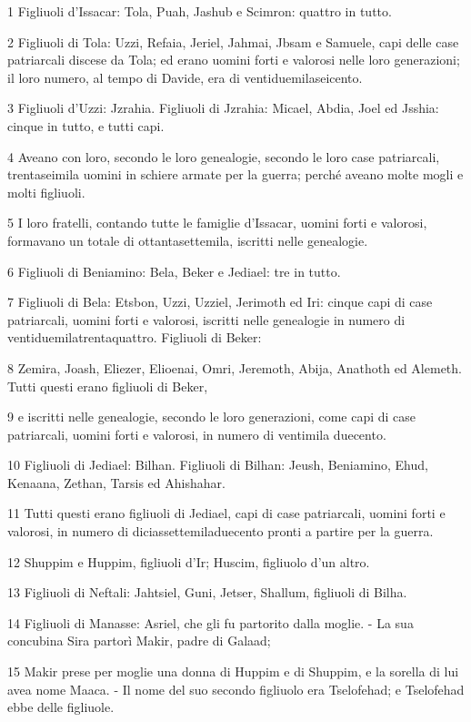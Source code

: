 \par 1 Figliuoli d'Issacar: Tola, Puah, Jashub e Scimron: quattro in tutto.
\par 2 Figliuoli di Tola: Uzzi, Refaia, Jeriel, Jahmai, Jbsam e Samuele, capi delle case patriarcali discese da Tola; ed erano uomini forti e valorosi nelle loro generazioni; il loro numero, al tempo di Davide, era di ventiduemilaseicento.
\par 3 Figliuoli d'Uzzi: Jzrahia. Figliuoli di Jzrahia: Micael, Abdia, Joel ed Jsshia: cinque in tutto, e tutti capi.
\par 4 Aveano con loro, secondo le loro genealogie, secondo le loro case patriarcali, trentaseimila uomini in schiere armate per la guerra; perché aveano molte mogli e molti figliuoli.
\par 5 I loro fratelli, contando tutte le famiglie d'Issacar, uomini forti e valorosi, formavano un totale di ottantasettemila, iscritti nelle genealogie.
\par 6 Figliuoli di Beniamino: Bela, Beker e Jediael: tre in tutto.
\par 7 Figliuoli di Bela: Etsbon, Uzzi, Uzziel, Jerimoth ed Iri: cinque capi di case patriarcali, uomini forti e valorosi, iscritti nelle genealogie in numero di ventiduemilatrentaquattro. Figliuoli di Beker:
\par 8 Zemira, Joash, Eliezer, Elioenai, Omri, Jeremoth, Abija, Anathoth ed Alemeth. Tutti questi erano figliuoli di Beker,
\par 9 e iscritti nelle genealogie, secondo le loro generazioni, come capi di case patriarcali, uomini forti e valorosi, in numero di ventimila duecento.
\par 10 Figliuoli di Jediael: Bilhan. Figliuoli di Bilhan: Jeush, Beniamino, Ehud, Kenaana, Zethan, Tarsis ed Ahishahar.
\par 11 Tutti questi erano figliuoli di Jediael, capi di case patriarcali, uomini forti e valorosi, in numero di diciassettemiladuecento pronti a partire per la guerra.
\par 12 Shuppim e Huppim, figliuoli d'Ir; Huscim, figliuolo d'un altro.
\par 13 Figliuoli di Neftali: Jahtsiel, Guni, Jetser, Shallum, figliuoli di Bilha.
\par 14 Figliuoli di Manasse: Asriel, che gli fu partorito dalla moglie. - La sua concubina Sira partorì Makir, padre di Galaad;
\par 15 Makir prese per moglie una donna di Huppim e di Shuppim, e la sorella di lui avea nome Maaca. - Il nome del suo secondo figliuolo era Tselofehad; e Tselofehad ebbe delle figliuole.
